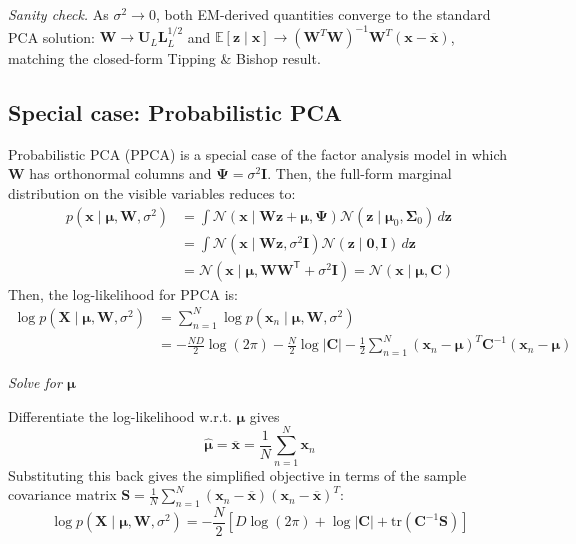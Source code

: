 \documentclass[11pt]{article}
\begin{document}
\textit{Sanity check.} As $\sigma^2\to0$, both EM-derived quantities converge to the standard PCA solution: $\hat{\mathbf{W}}\to\mathbf{U}_L\mathbf{L}_L^{1/2}$ and $\mathbb{E}[\mathbf{z}\mid\mathbf{x}]\to(\mathbf{W}^T\mathbf{W})^{-1}\mathbf{W}^T(\mathbf{x}-\overline{\mathbf{x}})$, matching the closed-form Tipping \& Bishop result.


\subsection{Special case: Probabilistic PCA}

Probabilistic PCA (PPCA) is a special case of the factor analysis model in which $\mathbf{W}$ has orthonormal columns and $\boldsymbol{\Psi} = \sigma^2 \mathbf{I}$. Then, the full-form marginal distribution on the visible variables reduces to:
\[ 
\begin{aligned}
p(\boldsymbol{x} \mid \boldsymbol{\mu}, \mathbf{W}, \sigma^2
) &= \int \mathcal{N}(\boldsymbol{x} \mid \mathbf{W}\boldsymbol{z} + \boldsymbol{\mu}, \boldsymbol{\Psi}) \mathcal{N}(\boldsymbol{z} \mid \boldsymbol{\mu}_0, \boldsymbol{\Sigma}_0) \, d\boldsymbol{z} \\
&= \int \mathcal{N}(\boldsymbol{x} \mid \mathbf{W}\boldsymbol{z}, \sigma^2 \mathbf{I}) \mathcal{N}(\boldsymbol{z} \mid \boldsymbol{0}, \boldsymbol{I}) \, d\boldsymbol{z} \\
&= \mathcal{N}(\boldsymbol{x} \mid \boldsymbol{\mu}, \mathbf{W}\mathbf{W}^\mathsf{T} + \sigma^2 \mathbf{I}) = \mathcal{N}(\boldsymbol{x} \mid \boldsymbol{\mu}, \mathbf{C})
\end{aligned}
\]
Then, the log-likelihood for PPCA is:
\[
\begin{aligned}
\log p(\mathbf{X}\mid\boldsymbol{\mu},\mathbf{W},\sigma^2) 
&= \sum_{n=1}^N \log p(\mathbf{x}_n\mid\boldsymbol{\mu},\mathbf{W},\sigma^2) \\
&= -\frac{ND}{2}\log(2\pi) - \frac{N}{2}\log|\mathbf{C}| - \frac{1}{2}\sum_{n=1}^N(\mathbf{x}_n-\boldsymbol{\mu})^T\mathbf{C}^{-1}(\mathbf{x}_n-\boldsymbol{\mu})
\end{aligned}
\]

\par\medskip
\noindent \textit{Solve for $\boldsymbol{\mu}$}

Differentiate the log-likelihood w.r.t. $\boldsymbol{\mu}$ gives
\[
\hat{\boldsymbol{\mu}} = \overline{\mathbf{x}} = \frac{1}{N}\sum_{n=1}^N \mathbf{x}_n
\]
Substituting this back gives the simplified objective in terms of the sample covariance matrix $\mathbf{S} = \frac{1}{N}\sum_{n=1}^N(\mathbf{x}_n-\overline{\mathbf{x}})(\mathbf{x}_n-\overline{\mathbf{x}})^T$:
\[
\log p(\mathbf{X}\mid\boldsymbol{\mu},\mathbf{W},\sigma^2) = -\frac{N}{2}\left[D\log(2\pi) + \log|\mathbf{C}| + \mathrm{tr}(\mathbf{C}^{-1}\mathbf{S})\right]
\]
\end{document}
